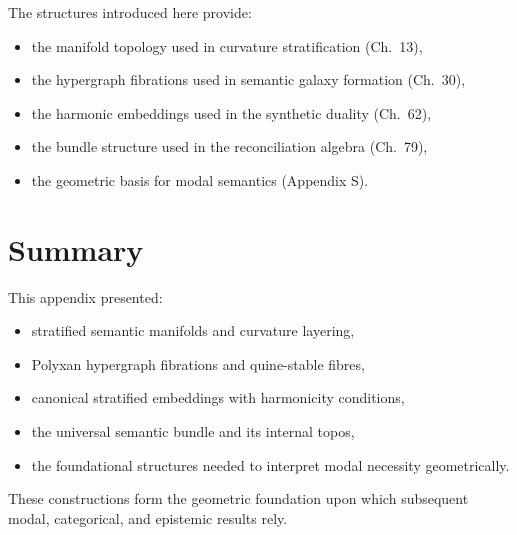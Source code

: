 The structures introduced here provide:
\begin{itemize}
\item the manifold topology used in curvature stratification (Ch.~13),
\item the hypergraph fibrations used in semantic galaxy formation (Ch.~30),
\item the harmonic embeddings used in the synthetic duality (Ch.~62),
\item the bundle structure used in the reconciliation algebra (Ch.~79),
\item the geometric basis for modal semantics (Appendix S).
\end{itemize}

\section{Summary}

This appendix presented:
\begin{itemize}
\item stratified semantic manifolds and curvature layering,
\item Polyxan hypergraph fibrations and quine-stable fibres,
\item canonical stratified embeddings with harmonicity conditions,
\item the universal semantic bundle and its internal topos,
\item the foundational structures needed to interpret modal necessity geometrically.
\end{itemize}

These constructions form the geometric foundation upon which subsequent modal, categorical, and epistemic results rely.

